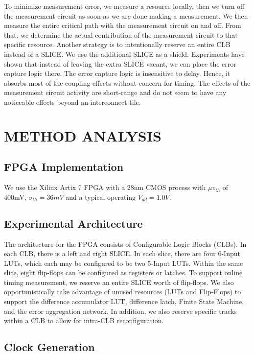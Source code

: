 \documentclass[11pt]{report}
\begin{document}
\begin{mainf}
To minimize measurement error, we measure a resource locally, then we turn off the measurement circuit as soon as we are done making a measurement. We then measure the entire critical path with the measurement circuit on and off. From that, we determine the actual contribution of the measurement circuit to that specific resource. Another strategy is to intentionally reserve an entire CLB instead of a SLICE. We use the additional SLICE as a shield. Experiments have shown that instead of leaving the extra SLICE vacant, we can place the error capture logic there. The error capture logic is insensitive to delay. Hence, it absorbs most of the coupling effects without concern for timing. The effects of the measurement circuit activity are short-range and do not seem to have any noticeable effects beyond an interconnect tile.  


\newpage

\section{\textbf{METHOD ANALYSIS}}
 
\subsection{\textbf{FPGA Implementation}}

We use the Xilinx Artix 7 FPGA with a 28nm CMOS process with $\mu v_{th}$ of 400mV, $\sigma _{th} = 36mV$ and a typical operating $V_{dd} = 1.0V$. 

\subsection{\textbf{Experimental Architecture}}

The architecture for the FPGA consists of Configurable Logic Blocks (CLBs). In each CLB, there is a left and right SLICE. In each slice, there are four 6-Input LUTs, which each may be configured to be two 5-Input LUTs. Within the same slice, eight flip-flops can be configured as registers or latches. To support online timing measurement, we reserve an entire SLICE worth of flip-flops. We also opportunistically take advantage of unused resources (LUTs and Flip-Flops) to support the difference accumulator LUT, difference latch, Finite State Machine, and the error aggregation network. In addition, we also reserve specific tracks within a CLB to allow for intra-CLB reconfiguration.

\subsection{\textbf{Clock Generation}}


\end{mainf}
\end{document}
